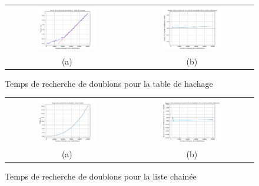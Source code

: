 \documentclass[a4paper,12pt]{article}
\numberwithin{equation}{section}
\begin{document}
\begin{figure}[ht]
\centering
\begin{tabular}{@{} c @{} c @{}}
\includegraphics[width=0.5\textwidth]{FigQues3_3_hach_1} & \includegraphics[width=0.5\textwidth]{FigQues3_3_hach_2} \tabularnewline
(a) & (b) \tabularnewline
\end{tabular}
\caption{Temps de recherche de doublons pour la table de hachage}
\label{FigQues3_3_hach}
\end{figure}

\begin{figure}[ht]
\centering
\begin{tabular}{@{} c @{} c @{}}
\includegraphics[width=0.5\textwidth]{FigQues3_3_list_1} & \includegraphics[width=0.5\textwidth]{FigQues3_3_list_2} \tabularnewline
(a) & (b) \tabularnewline
\end{tabular}
\caption{Temps de recherche de doublons pour la liste chainée}
\label{FigQues3_3_list}
\end{figure}
\end{document}
